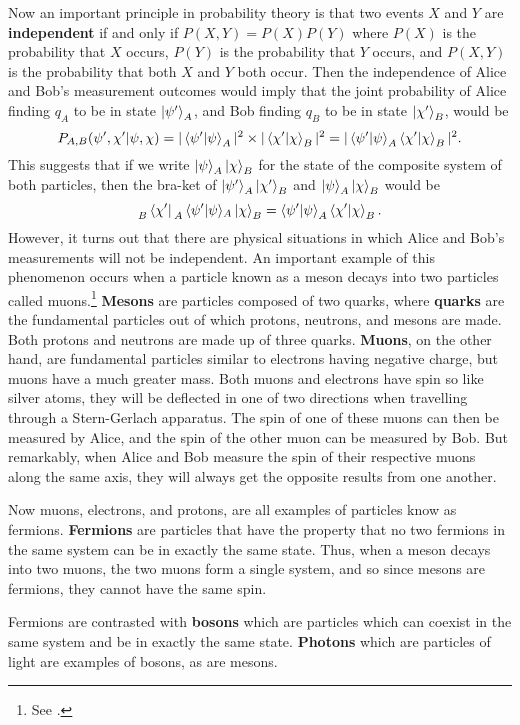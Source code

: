 Now an important principle in probability theory is that two events $X$ and $Y$ are \textbf{independent} if and only if 
$P(X,Y)=P(X)P(Y)$
where $P(X)$ is the probability that $X$ occurs, $P(Y)$ is the probability that $Y$ occurs, and $P(X,Y)$ is the probability that both $X$ and $Y$ both occur. Then the independence of Alice and Bob's measurement outcomes would imply that the joint probability of Alice finding $q_A$ to be in state $
\ket{\psi'}_A$, and Bob finding $q_B$ to be in state $\ket{\chi'}_B$, would be 
$$P_{A,B}(\psi',\chi'|\psi,\chi)=|\ip{\psi'}{\psi}_A|^2\times|\ip{\chi'}{\chi}_B|^2=|\ip{\psi'}{\psi}_A\ip{\chi'}{\chi}_B|^2.$$
This suggests that if we write $\ket{\psi}_A\ket{\chi}_B$ for the state of the composite system of both particles, then the bra-ket of $\ket{\psi'}_A\ket{\chi'}_B$ and $\ket{\psi}_A\ket{\chi}_B$ 
would be
$$\prescript{}{B}{ \bra*{\chi'}}\prescript{}{A}{\ip*{\psi'}{\psi}}_A\ket*{\chi}_B=\ip{\psi'}{\psi}_A\ip{\chi'}{\chi}_B.
$$
However, it turns out that there are physical situations in which Alice and Bob's measurements will not be independent. An important example of this phenomenon occurs when a particle known as a meson decays into two particles called muons.\footnote{See \cite[p. 242]{Sakurai}.} \textbf{Mesons} are particles composed of two quarks, where \textbf{quarks} are the fundamental particles out of which protons, neutrons, and mesons are made. Both protons and neutrons are made up of three quarks. \textbf{Muons}, on the other hand, are fundamental particles similar to electrons having negative charge, but muons have a much greater mass. Both muons and electrons have spin so like silver atoms, they will be deflected in one of two directions when travelling through a Stern-Gerlach apparatus. The spin of one of these muons can then be measured by Alice, and the spin of the other muon can be measured by Bob. But remarkably, when Alice and Bob measure the spin of their respective muons along the same axis, they will always get the opposite results from one another. 

Now muons, electrons, and protons, are all examples of particles know as fermions. \textbf{Fermions} are particles that have the property that no two fermions in the same system can be in exactly the same state. Thus, when a meson decays into two muons, the two muons form a single system, and so since mesons are fermions, they cannot have the same spin.

Fermions are contrasted with \textbf{bosons} which are particles which can coexist in the same system and be in exactly the same state. \textbf{Photons} which are particles of light are examples of bosons, as are mesons.

